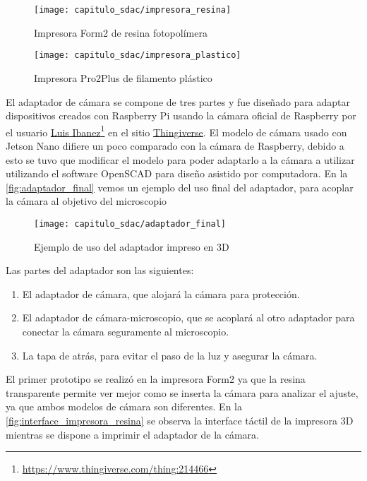\begin{figure}[H]
    \centering
    \texttt{[image: capitulo\_sdac/impresora\_resina]}
    \caption{Impresora Form2 de resina fotopolímera}\label{fig:resina}
\end{figure}

\begin{figure}[H]
    \centering
    \texttt{[image: capitulo\_sdac/impresora\_plastico]}
    \caption{Impresora Pro2Plus de filamento plástico}\label{fig:plastico}
\end{figure}

El adaptador de cámara se compone de tres partes y fue diseñado para adaptar
dispositivos creados con Raspberry Pi usando la cámara oficial de Raspberry por
el usuario \hyperlink{https://www.thingiverse.com/luisibanez/about}{Luis
Ibanez}\footnote{\url{https://www.thingiverse.com/thing:214466}} en el sitio
\hyperlink{https://www.thingiverse.com/}{Thingiverse}. El modelo de cámara usado
con Jetson Nano difiere un poco comparado con la cámara de Raspberry, debido a
esto se tuvo que modificar el modelo para poder adaptarlo a la cámara a utilizar
utilizando el software OpenSCAD para diseño asistido por computadora. En la
\autoref{fig:adaptador_final} vemos un ejemplo del uso final del adaptador, para
acoplar la cámara al objetivo del microscopio

\begin{figure}[H]
    \centering
    \texttt{[image: capitulo\_sdac/adaptador\_final]}
    \caption{Ejemplo de uso del adaptador impreso en 3D}\label{fig:adaptador_final}
\end{figure}

\begin{minipage}{\textwidth}
    Las partes del adaptador son las siguientes:
    \begin{enumerate}
        \item El adaptador de cámara, que alojará la cámara para protección.
        \item El adaptador de cámara-microscopio, que se acoplará al otro adaptador
        para conectar la cámara seguramente al microscopio.
        \item La tapa de atrás, para evitar el paso de la luz y asegurar la cámara.
    \end{enumerate}
\end{minipage}


El primer prototipo se realizó en la impresora Form2 ya que la resina
transparente permite ver mejor como se inserta la cámara para analizar el
ajuste, ya que ambos modelos de cámara son diferentes. En la
\autoref{fig:interface_impresora_resina} se observa la interface táctil de la
impresora 3D mientras se dispone a imprimir el adaptador de la cámara.


